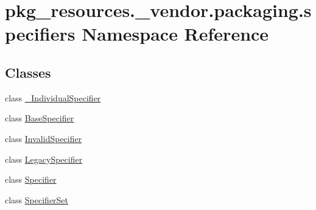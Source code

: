 \hypertarget{namespacepkg__resources_1_1__vendor_1_1packaging_1_1specifiers}{}\section{pkg\+\_\+resources.\+\_\+vendor.\+packaging.\+specifiers Namespace Reference}
\label{namespacepkg__resources_1_1__vendor_1_1packaging_1_1specifiers}
\subsection*{Classes}
\begin{DoxyCompactItemize}
\item 
class \hyperlink{classpkg__resources_1_1__vendor_1_1packaging_1_1specifiers_1_1__IndividualSpecifier}{\+\_\+\+Individual\+Specifier}
\item 
class \hyperlink{classpkg__resources_1_1__vendor_1_1packaging_1_1specifiers_1_1BaseSpecifier}{Base\+Specifier}
\item 
class \hyperlink{classpkg__resources_1_1__vendor_1_1packaging_1_1specifiers_1_1InvalidSpecifier}{Invalid\+Specifier}
\item 
class \hyperlink{classpkg__resources_1_1__vendor_1_1packaging_1_1specifiers_1_1LegacySpecifier}{Legacy\+Specifier}
\item 
class \hyperlink{classpkg__resources_1_1__vendor_1_1packaging_1_1specifiers_1_1Specifier}{Specifier}
\item 
class \hyperlink{classpkg__resources_1_1__vendor_1_1packaging_1_1specifiers_1_1SpecifierSet}{Specifier\+Set}
\end{DoxyCompactItemize}
